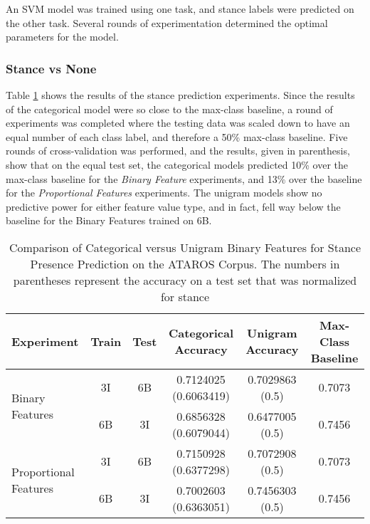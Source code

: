 An SVM model was trained using one task, and stance labels were predicted on the other task.  Several rounds of experimentation determined the optimal parameters for the model.    

\subsubsection{Stance vs None} 

Table \ref{tab:cat_vs_unigram_feats_SVN} shows the results of the stance prediction experiments.  Since the results of the categorical model were so close to the max-class baseline, a round of experiments was completed where the testing data was scaled down to have an equal number of each class label, and therefore a 50\% max-class baseline.  Five rounds of cross-validation was performed, and the results, given in parenthesis, show that on the equal test set, the categorical models predicted 10\% over the max-class baseline for the \emph{Binary Feature} experiments, and 13\% over the baseline for the \emph{Proportional Features} experiments.  The unigram models show no predictive power for either feature value type, and in fact, fell way below the baseline for the Binary Features trained on 6B. 

\begin{table}[h]
\centering
\begin{tabular}{l c c c c c}
	
	\textbf{Experiment} & \textbf{Train} & \textbf{Test} & \textbf{Categorical Accuracy} & \textbf{Unigram Accuracy} & \textbf{Max-Class Baseline} \\
	\hline
	\multirow{2}{*}{Binary Features} 
	    & 3I  & 6B & \num{0.7124025} (\num{0.6063419}) & \num{0.7029863} (\num{0.5}) & \num{0.7073} \\   
	    & 6B  & 3I & \num{0.6856328} (\num{0.6079044}) & \num{0.6477005} (\num{0.5}) & \num{0.7456} \\
	\hline 
	\multirow{2}{*}{Proportional Features} 
	    & 3I  & 6B & \num{0.7150928} (\num{0.6377298}) & \num{0.7072908} (\num{0.5}) & \num{0.7073} \\   
	    & 6B  & 3I & \num{0.7002603} (\num{0.6363051}) & \num{0.7456303} (\num{0.5}) & \num{0.7456} \\
\end{tabular}
\caption{Comparison of Categorical versus Unigram Binary Features for Stance Presence Prediction on the ATAROS Corpus.  The numbers in parentheses represent the accuracy on a test set that was normalized for stance}
\label{tab:cat_vs_unigram_feats_SVN}
\end{table}

